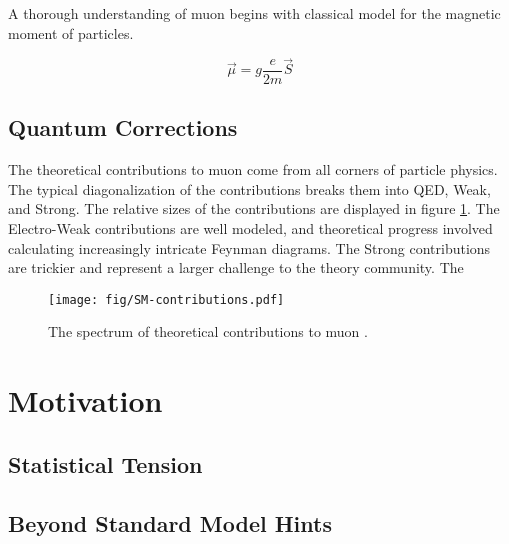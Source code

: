A thorough understanding of muon \gmtwo begins with classical model for the magnetic moment of particles. 

\begin{equation}
\vec{\mu} = g \frac{e}{2m}\vec{S}
\label{eqn:spin-magnetic-moment}
\end{equation}


\subsection{Quantum Corrections}

The theoretical contributions to muon \gmtwo come from all corners of particle physics.  The typical diagonalization of the contributions breaks them into QED, Weak, and Strong. The relative sizes of the contributions are displayed in figure \ref{fig:sm-contributions}. The Electro-Weak contributions are well modeled, and theoretical progress involved calculating increasingly intricate Feynman diagrams.  The Strong contributions are trickier and represent a larger challenge to the theory community.  The 

\begin{figure}
\texttt{[image: fig/SM-contributions.pdf]}
\label{fig:sm-contributions}
\caption{The spectrum of theoretical contributions to muon \gmtwo.}
\end{figure}


\section{Motivation}

\subsection{Statistical Tension}

\subsection{Beyond Standard Model Hints}



